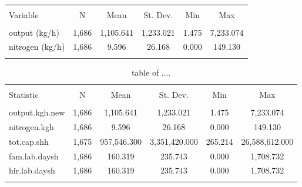 \documentclass{article}
\begin{document}
\begin{table}[!htbp] \centering 
  \caption{} 
  \label{} 
\begin{tabular}{@{\extracolsep{5pt}}lccccc} 
\\[-1.8ex]\hline 
\hline \\[-1.8ex] 
Variable & \multicolumn{1}{c}{N} & \multicolumn{1}{c}{Mean} & \multicolumn{1}{c}{St. Dev.} & \multicolumn{1}{c}{Min} & \multicolumn{1}{c}{Max} \\ 
\hline \\[-1.8ex] 
output (kg/h) & 1,686 & 1,105.641 & 1,233.021 & 1.475 & 7,233.074 \\ 
nitrogen (kg/h) & 1,686 & 9.596 & 26.168 & 0.000 & 149.130 \\ 
\hline \\[-1.8ex] 
\end{tabular} 
\end{table} 

\begin{table}[!htbp] \centering 
  \caption{table of ....} 
  \label{} 
\begin{tabular}{@{\extracolsep{5pt}}lccccc} 
\\[-1.8ex]\hline 
\hline \\[-1.8ex] 
Statistic & \multicolumn{1}{c}{N} & \multicolumn{1}{c}{Mean} & \multicolumn{1}{c}{St. Dev.} & \multicolumn{1}{c}{Min} & \multicolumn{1}{c}{Max} \\ 
\hline \\[-1.8ex] 
output.kgh.new & 1,686 & 1,105.641 & 1,233.021 & 1.475 & 7,233.074 \\ 
nitrogen.kgh & 1,686 & 9.596 & 26.168 & 0.000 & 149.130 \\ 
tot.cap.shh & 1,675 & 957,546.300 & 3,351,420.000 & 265.214 & 26,588,612.000 \\ 
fam.lab.daysh & 1,686 & 160.319 & 235.743 & 0.000 & 1,708.732 \\ 
hir.lab.daysh & 1,686 & 160.319 & 235.743 & 0.000 & 1,708.732 \\ 
\hline \\[-1.8ex] 
\end{tabular} 
\end{table} 
\end{document}
